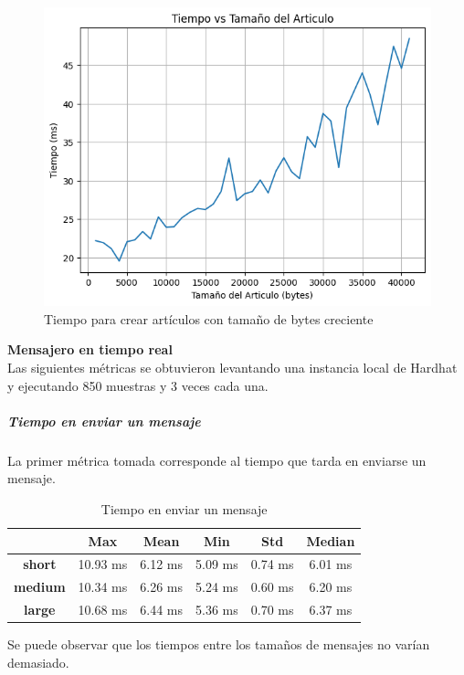 \begin{figure}[H]
    \centering
    \includegraphics[width=0.75\linewidth]{aw-eth-bytes-articulo-incremental-tiempo.png}
    \caption{Tiempo para crear artículos con tamaño de bytes creciente}
    \label{fig:aw-eth-bytes-articulo-incremental-tiempo}
\end{figure}

\textbf{Mensajero en tiempo real}\\

Las siguientes métricas se obtuvieron levantando una instancia local de Hardhat \cite{hardhat} y ejecutando 850 muestras y 3 veces cada una.

\subparagraph{Tiempo en enviar un mensaje}

La primer métrica tomada corresponde al tiempo que tarda en enviarse un mensaje.

\setlength\tabcolsep{10pt}
\begin{table}[!htbp]
    \centering
    \begin{tabular}{|c|c|c|c|c|c|}
    \hline
    & \textbf{Max} & \textbf{Mean} & \textbf{Min} & \textbf{Std} & \textbf{Median} \\
    \hline
    \textbf{short} & 10.93 ms & 6.12 ms & 5.09 ms & 0.74 ms & 6.01 ms \\
    \hline
    \textbf{medium} & 10.34 ms & 6.26 ms & 5.24 ms & 0.60 ms & 6.20 ms \\
    \hline
    \textbf{large} & 10.68 ms & 6.44 ms & 5.36 ms & 0.70 ms & 6.37 ms \\
    \hline
    \end{tabular}
    \caption{Tiempo en enviar un mensaje}
\end{table}

Se puede observar que los tiempos entre los tamaños de mensajes no varían demasiado.


